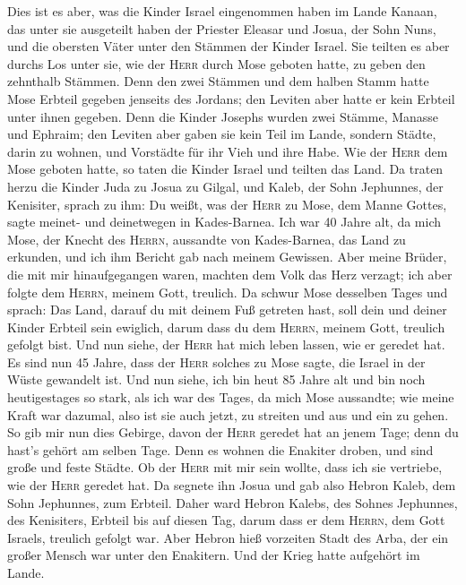  Dies ist es aber, was die Kinder Israel eingenommen haben
im Lande Kanaan, das unter sie ausgeteilt haben der Priester Eleasar und
Josua, der Sohn Nuns, und die obersten Väter unter den Stämmen der
Kinder Israel.  Sie teilten es aber durchs Los unter sie,
wie der \textsc{Herr} durch Mose geboten hatte, zu geben den zehnthalb
Stämmen.  Denn den zwei Stämmen und dem halben Stamm hatte
Mose Erbteil gegeben jenseits des Jordans; den Leviten aber hatte er
kein Erbteil unter ihnen gegeben.  Denn die Kinder Josephs
wurden zwei Stämme, Manasse und Ephraim; den Leviten aber gaben sie kein
Teil im Lande, sondern Städte, darin zu wohnen, und Vorstädte für ihr
Vieh und ihre Habe.  Wie der \textsc{Herr} dem Mose
geboten hatte, so taten die Kinder Israel und teilten das Land.
 Da traten herzu die Kinder Juda zu Josua zu Gilgal, und
Kaleb, der Sohn Jephunnes, der Kenisiter, sprach zu ihm: Du weißt, was
der \textsc{Herr} zu Mose, dem Manne Gottes, sagte meinet- und
deinetwegen in Kades-Barnea.  Ich war 40 Jahre alt, da
mich Mose, der Knecht des \textsc{Herrn}, aussandte von Kades-Barnea,
das Land zu erkunden, und ich ihm Bericht gab nach meinem Gewissen.
 Aber meine Brüder, die mit mir hinaufgegangen waren,
machten dem Volk das Herz verzagt; ich aber folgte dem \textsc{Herrn},
meinem Gott, treulich.  Da schwur Mose desselben Tages und
sprach: Das Land, darauf du mit deinem Fuß getreten hast, soll dein und
deiner Kinder Erbteil sein ewiglich, darum dass du dem \textsc{Herrn},
meinem Gott, treulich gefolgt bist.  Und nun siehe, der
\textsc{Herr} hat mich leben lassen, wie er geredet hat. Es sind nun 45
Jahre, dass der \textsc{Herr} solches zu Mose sagte, die Israel in der
Wüste gewandelt ist. Und nun siehe, ich bin heut 85 Jahre alt
 und bin noch heutigestages so stark, als ich war des
Tages, da mich Mose aussandte; wie meine Kraft war dazumal, also ist sie
auch jetzt, zu streiten und aus und ein zu gehen.  So gib
mir nun dies Gebirge, davon der \textsc{Herr} geredet hat an jenem Tage;
denn du hast's gehört am selben Tage. Denn es wohnen die Enakiter
droben, und sind große und feste Städte. Ob der \textsc{Herr} mit mir
sein wollte, dass ich sie vertriebe, wie der \textsc{Herr} geredet hat.
 Da segnete ihn Josua und gab also Hebron Kaleb, dem Sohn
Jephunnes, zum Erbteil.  Daher ward Hebron Kalebs, des
Sohnes Jephunnes, des Kenisiters, Erbteil bis auf diesen Tag, darum dass
er dem \textsc{Herrn}, dem Gott Israels, treulich gefolgt war.
 Aber Hebron hieß vorzeiten Stadt des Arba, der ein
großer Mensch war unter den Enakitern. Und der Krieg hatte aufgehört im
Lande.


